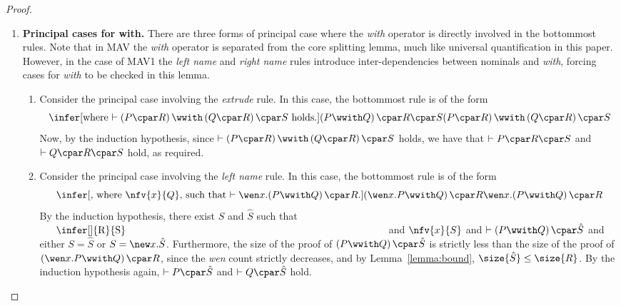 \documentclass[UKenglish,acmsmall,authorversion]{acmart}
\theoremstyle{plain}
\begin{document}
{\begin{proof}
\begin{enumerate}[label=\textbf{\Alph*},ref=\Alph*,leftmargin=*]
\item \textbf{Principal cases for with.}
There are three forms of principal case where the \textit{with} operator is directly involved in the bottommost rules.
Note that in \textsf{MAV} the \textit{with} operator is separated from the core splitting lemma, much like universal quantification in this paper.
However, in the case of \textsf{MAV1} the \textit{left name} and \textit{right name} rules introduce inter-dependencies between nominals and \textit{with}, forcing cases for \textit{with} to be checked in this lemma.

\begin{enumerate}[label*=\textbf{.\arabic*}]

\item Consider the principal case involving the \textit{extrude} rule.
In this case, the bottommost rule is of the form 
\[
\infer[\mbox{where $\vdash \left(P  \cpar R\right)\wwith\left( Q \cpar R\right) \cpar S$ holds.}]{
\left(P \wwith Q\right) \cpar R \cpar S
}{
\left(P  \cpar R\right)\wwith\left( Q \cpar R\right) \cpar S
}
\]
Now, by the induction hypothesis, 
since $\vdash \left(P  \cpar R\right)\wwith\left( Q \cpar R\right) \cpar S$ holds, we have that 
$\vdash P  \cpar R \cpar S$ and $\vdash Q \cpar R \cpar S$ hold, as required.


\item Consider the principal case involving the \textit{left name} rule.
In this case, the bottommost rule is of the form 
\[
\infer[\mbox{, where $\nfv{x}{Q}$, such that $\vdash \mathopen{\wen x.}\left( P \wwith Q \right) \cpar R$.}]{
\left( \wen x.P \wwith Q \right) \cpar R
}{
\mathopen{\wen x.}\left( P \wwith Q \right) \cpar R
}
\] 
By the induction hypothesis, there exist $S$ and $\hat{S}$ such that
$\vcenter{\infer[]{R}{S}}$ and $\nfv{x}{S}$ and $\vdash \left(P \wwith Q\right) \cpar \hat{S}$ 
and either $S = \hat{S}$ or $S = \mathopen{\new x.}\hat{S}$. Furthermore, the size of the proof of $\left(P \wwith Q\right) \cpar \hat{S}$ is strictly less than the size of the proof of $\left( \wen x.P \wwith Q \right) \cpar R$, since the \textit{wen} count strictly decreases, and by Lemma~\ref{lemma:bound}, $\size{\hat{S}} \leq \size{R}$.
By the induction hypothesis again, $\vdash P \cpar \hat{S}$ and $\vdash Q \cpar \hat{S}$ hold.


\end{enumerate}
\end{enumerate}
\end{proof}}
\end{document}
